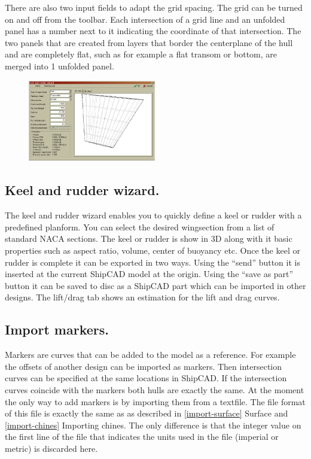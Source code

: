 \documentclass[12pt]{article}
\begin{document}
There are also two input fields to adapt the grid spacing. The grid
can be turned on and off from the toolbar. Each intersection of a grid
line and an unfolded panel has a number next to it indicating the
coordinate of that intersection.  The two panels that are created from
layers that border the centerplane of the hull and are completely
flat, such as for example a flat transom or bottom, are merged into 1
unfolded panel.

\begin{figure}
        \centering
        \includegraphics[width=0.5\textwidth,natwidth=566,natheight=360]{keelandrudder.png}
        \caption{}
        \label{fig:keelandrudder}
\end{figure}

\subsection{Keel and rudder wizard.}
The keel and rudder wizard enables you to quickly define a keel or
rudder with a predefined planform. You can select the desired
wingsection from a list of standard NACA sections. The keel or rudder
is show in 3D along with it basic properties such as aspect ratio,
volume, center of buoyancy etc.  Once the keel or rudder is complete
it can be exported in two ways. Using the “send” button it is inserted
at the current ShipCAD model at the origin. Using the “save as part”
button it can be saved to disc as a ShipCAD part which can be imported
in other designs. The lift/drag tab shows an estimation for the lift
and drag curves.

\subsection{Import markers.}
Markers are curves that can be added to the model as a reference. For
example the offsets of another design can be imported as markers. Then
intersection curves can be specified at the same locations in
ShipCAD. If the intersection curves coincide with the markers both
hulls are exactly the same. At the moment the only way to add markers
is by importing them from a textfile. The file format of this file is
exactly the same as as described in \ref{import-surface} Surface and
\ref{import-chines} Importing
chines.  The only difference is that the integer value on the first
line of the file that indicates the units used in the file (imperial
or metric) is discarded here.
\end{document}

